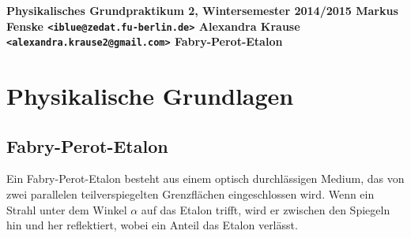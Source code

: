 \documentclass[a4paper,german,12pt,smallheadings]{scrartcl}
\begin{document}
\begin{titlepage}

\end{titlepage}
\allowdisplaybreaks %
\begin{center}
\bfseries %
\sffamily %
\vspace{-40pt}
Physikalisches Grundpraktikum 2, Wintersemester 2014/2015
Markus Fenske \texttt{<iblue@zedat.fu-berlin.de>}
Alexandra Krause \texttt{<alexandra.krause2@gmail.com>}
Fabry-Perot-Etalon
\vspace{-10pt}
\end{center}
\section{Physikalische Grundlagen}
\subsection{Fabry-Perot-Etalon}
Ein Fabry-Perot-Etalon besteht aus einem optisch durchlässigen Medium, das von
zwei parallelen teilverspiegelten Grenzflächen eingeschlossen wird. Wenn ein
Strahl unter dem Winkel $\alpha$ auf das Etalon trifft, wird er zwischen den
Spiegeln hin und her reflektiert, wobei ein Anteil das Etalon verlässt.
\end{document}
